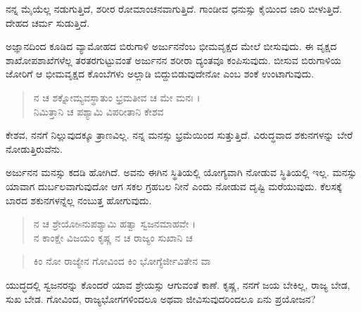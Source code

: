 {\small ನನ್ನ ಮೈಯೆಲ್ಲ ನಡುಗುತ್ತಿದೆ, ಶರೀರ ರೋಮಾಂಚನವಾಗುತ್ತಿದೆ. ಗಾಂಡೀವ ಧನುಸ್ಸು ಕೈಯಿಂದ ಜಾರಿ ಬೀಳುತ್ತಿದೆ. ದೇಹದ ಚರ್ಮ ಸುಡುತ್ತಿದೆ.}

ಅಜ್ಞಾನದಿಂದ ಕೂಡಿದ ವ್ಯಾಮೋಹದ ಬಿರುಗಾಳಿ ಅರ್ಜುನನೆಂಬ ಭೀಮವೃಕ್ಷದ ಮೇಲೆ ಬೀಸುವುದು. ಈ ವೃಕ್ಷದ ಶಾಖೋಪಶಾಖೆಗಳೆಲ್ಲ ತರತರಗುಟ್ಟುವಂತೆ ಅರ್ಜುನನ ಶರೀರಾ ದ್ಯಂತವೂ ಕಂಪಿಸುವುದು. ಬೀಸುವ ಬಿರುಗಾಳಿಯ ಜೋರಿಗೆ ಆ ಭೀಮವೃಕ್ಷದ ಕೊಂಬೆಗಳು ಅಲ್ಲಾಡಿ ಬಿದ್ದುಬಿಡುವುದೇನೋ ಎಂಬ ಶಂಕೆ ಉಂಟಾಗುವುದು.

\begin{verse}
ನ ಚ ಶಕ್ನೋಮ್ಯವಸ್ಥಾತುಂ ಭ್ರಮತೀವ ಚ ಮೇ ಮನಃ ।\\ನಿಮಿತ್ತಾನಿ ಚ ಪಶ್ಯಾಮಿ ವಿಪರೀತಾನಿ ಕೇಶವ 
\end{verse}

{\small ಕೇಶವ, ನನಗೆ ನಿಲ್ಲುವುದಕ್ಕೂ ತ್ರಾಣವಿಲ್ಲ. ನನ್ನ ಮನಸ್ಸು ಭ್ರಮೆಯಿಂದ ಸುತ್ತುತ್ತಿದೆ. ವಿರುದ್ಧವಾದ ಶಕುನಗಳನ್ನು ಬೇರೆ ನೋಡುತ್ತಿರುವೆನು.}

ಅರ್ಜುನನ ಮನಸ್ಸು ಕದಡಿ ಹೋಗಿದೆ. ಅವನು ಈಗಿನ ಸ್ಥಿತಿಯಲ್ಲಿ ಯೋಗ್ಯವಾಗಿ ನೋಡುವ ಸ್ಥಿತಿಯಲ್ಲಿ ಇಲ್ಲ. ಮನಸ್ಸು ಯಾವಾಗ ದುರ್ಬಲವಾಗುವುದೋ ಆಗ ಸಕಲ ಗ್ರಹಬಲ ನೀನೆ ಎಂದು ನೋಡುವ ದೃಷ್ಟಿ ಮರೆಯುವುದು. ಕೆಲಸಕ್ಕೆ ಬಾರದ ಶಕುನಗಳನ್ನೆಲ್ಲ ನಂಬುತ್ತ ಹೋಗುವುದು.

\begin{verse}
ನ ಚ ಶ್ರೇಯೋsನುಪಶ್ಯಾಮಿ ಹತ್ವಾ ಸ್ವಜನಮಾಹವೇ ।\\ನ ಕಾಂಕ್ಷೇ ವಿಜಯಂ ಕೃಷ್ಣ ನ ಚ ರಾಜ್ಯಂ ಸುಖಾನಿ ಚ 
\end{verse}

\begin{verse}
ಕಿಂ ನೋ ರಾಜ್ಯೇನ ಗೋವಿಂದ ಕಿಂ ಭೋಗ್ಯೆರ್ಜೀವಿತೇನ ವಾ 
\end{verse}

{\small ಯುದ್ಧದಲ್ಲಿ ಸ್ವಜನರನ್ನು ಕೊಂದರೆ ಯಾವ ಶ್ರೇಯಸ್ಸು ಆಗುವಂತೆ ಕಾಣೆ. ಕೃಷ್ಣ, ನನಗೆ ಜಯ ಬೇಕಿಲ್ಲ, ರಾಜ್ಯ ಬೇಡ, ಸುಖ ಬೇಡ. ಗೋವಿಂದ, ರಾಜ್ಯಭೋಗಗಳಿಂದಲೂ ಅಥವಾ ಜೀವಿಸುವುದರಿಂದಲೂ ಏನು ಪ್ರಯೋಜನ?}

